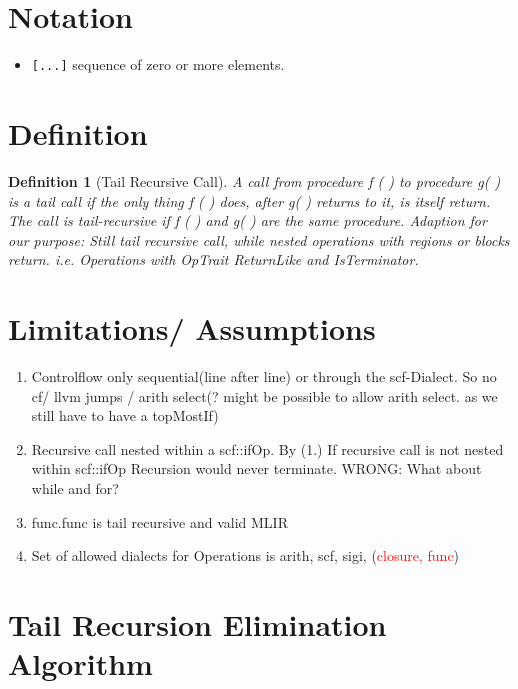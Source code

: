 \documentclass{article}
\begin{document}
\newtheorem{definition}{Definition}[section]
\tableofcontents



\section{Notation}
\begin{itemize}
    \item \texttt{[...]} sequence of zero or more elements. 
\end{itemize}

\section{Definition}
\begin{definition}[Tail Recursive Call]
A call from procedure f ( ) to procedure g( ) is a tail call if the only thing
f ( ) does, after g( ) returns to it, is itself return. The call is tail-recursive if f ( )
and g( ) are the same procedure.\cite{10.5555/286076}
\newline
Adaption for our purpose:\newline
Still tail recursive call, while nested operations with regions or blocks return. i.e. 
Operations with OpTrait ReturnLike and IsTerminator.

\end{definition}

\section{Limitations/ Assumptions}
\begin{enumerate}
    \item Controlflow only sequential(line after line) or through the scf-Dialect. So no cf/ llvm jumps / arith select(? might be possible to allow arith select. as we still have to have a topMostIf)
    \item Recursive call nested within a scf::ifOp. By (1.) If recursive call is not nested within scf::ifOp Recursion would never terminate.  WRONG: What about while and for?
    \item func.func is tail recursive and valid MLIR
    \item Set of allowed dialects for Operations is arith, scf, sigi, (\textcolor{red}{closure, func})
\end{enumerate}

\section{Tail Recursion Elimination Algorithm}
\end{document}
